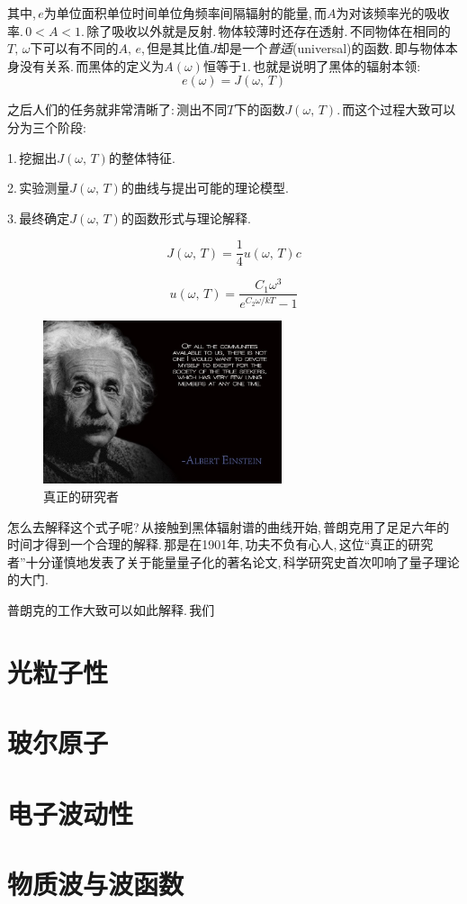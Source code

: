 其中,\,$e$为单位面积单位时间单位角频率间隔辐射的能量,\,而$A$为对该频率光的吸收率.\,$0<A<1$.\,除了吸收以外就是反射.\,物体较薄时还存在透射.\,不同物体在相同的$T,\,\omega$下可以有不同的$A,\,e$,\,但是其比值$J$却是一个\emph{普适}(universal)的函数.\,即与物体本身没有关系.\,而黑体的定义为$A(\omega)$恒等于$1$.\,也就是说明了黑体的辐射本领:
\[e(\omega)=J(\omega,\,T)\]

之后人们的任务就非常清晰了:\,测出不同$T$下的函数$J(\omega,\,T)$.\,而这个过程大致可以分为三个阶段:

1.\,挖掘出$J(\omega,\,T)$的整体特征.

2.\,实验测量$J(\omega,\,T)$的曲线与提出可能的理论模型.

3.\,最终确定$J(\omega,\,T)$的函数形式与理论解释.

\[J(\omega,\,T)=\frac{1}{4}u(\omega,\,T)c\]

\[u(\omega,\,T)=\frac{C_1\omega^3}{e^{C_2\omega/kT}-1}\]

\begin{figure}
\centering
\vspace{-15pt}
\includegraphics[width=7cm]{image/19-1-2.jpg}
\caption{真正的研究者}
\end{figure}
怎么去解释这个式子呢?\,从接触到黑体辐射谱的曲线开始,\,普朗克用了足足六年的时间才得到一个合理的解释.\,那是在1901年,\,功夫不负有心人,\,这位``真正的研究者''十分谨慎地发表了关于能量量子化的著名论文,\,科学研究史首次叩响了量子理论的大门.

普朗克的工作大致可以如此解释.\,我们


\section{光粒子性}

\section{玻尔原子}

\section{电子波动性}

\section{物质波与波函数}

